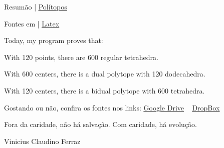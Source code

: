 \documentclass[12pt]{article}
\begin{document}
\Large

\begin{center} Resum\~ao | \href{https://drive.google.com/open?id=1GLKu3t37DBGDA6l8v-TJTNLkG7PeAojl}{\color{blue}\underline{Pol\'itopos}}
\end{center}

\vspace{3mm}

\begin{center} Fontes em | \href{https://drive.google.com/file/d/1phUQO-HT7DYhAXLXW-yqCiEGUZJ7kV9f/view?usp=sharing}{\color{blue}\underline{Latex}}
\end{center}

\vspace{3mm}

Today, my program proves that:

With 120 points, there are 600 regular tetrahedra.

With 600 centers, there is a dual polytope with 120 dodecahedra.

With 120 centers, there is a bidual polytope with 600 tetrahedra.

\vspace{3mm}

Gostando ou n\~ao, confira os fontes nos links: \href{https://drive.google.com/open?id=1M_F7Kbrt0EbAXIL11U0AngV0gmLhiYK6}{\color{blue}\underline{Google Drive}}\,\,\,\,\,\,\,\href{https://www.dropbox.com/s/ro3p3d6ye5ue0nu/PolyhedraGroups.zip?dl=0}{\color{blue}\underline{DropBox}}

\vspace{3mm}

Fora da caridade, n\~ao h\'a salva\c{c}\~ao. Com caridade, h\'a evolu\c{c}\~ao.

Vinicius Claudino Ferraz
\end{document}
